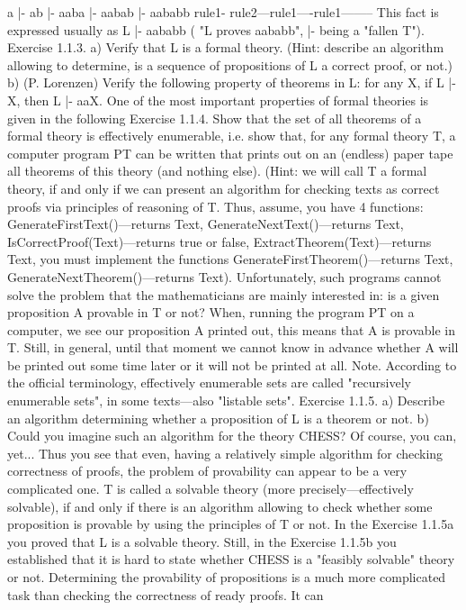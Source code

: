 a |- ab |- aaba |- aabab |- aababb
rule1- rule2---rule1----rule1--------
This fact is expressed usually as L |- aababb ( "L proves aababb", |- being a "fallen T").
Exercise 1.1.3. a) Verify that L is a formal theory. (Hint: describe an algorithm allowing to determine, is a
sequence of propositions of L a correct proof, or not.)
b) (P. Lorenzen) Verify the following property of theorems in L: for any X, if L |- X, then L |- aaX.
One of the most important properties of formal theories is given in the following
Exercise 1.1.4. Show that the set of all theorems of a formal theory is effectively enumerable, i.e.
show that, for any formal theory T, a computer program PT can be written that prints out on an (endless)
paper tape all theorems of this theory (and nothing else). (Hint: we will call T a formal theory, if and only
if we can present an algorithm for checking texts as correct proofs via principles of reasoning of T. Thus,
assume, you have 4 functions: GenerateFirstText()---returns Text, GenerateNextText()---returns Text,
IsCorrectProof(Text)---returns true or false, ExtractTheorem(Text)---returns Text, you must implement the
functions GenerateFirstTheorem()---returns Text, GenerateNextTheorem()---returns Text).
Unfortunately, such programs cannot solve the problem that the mathematicians are mainly
interested in: is a given proposition A provable in T or not? When, running the program PT on a
computer, we see our proposition A printed out, this means that A is provable in T. Still, in general, until
that moment we cannot know in advance whether A will be printed out some time later or it will not be
printed at all.
Note. According to the official terminology, effectively enumerable sets are called "recursively
enumerable sets", in some texts---also "listable sets".
Exercise 1.1.5. a) Describe an algorithm determining whether a proposition of L is a theorem or not.
b) Could you imagine such an algorithm for the theory CHESS? Of course, you can, yet... Thus you see
that even, having a relatively simple algorithm for checking correctness of proofs, the problem of
provability can appear to be a very complicated one.
T is called a solvable theory (more precisely---effectively solvable), if and only if there is an algorithm
allowing to check whether some proposition is provable by using the principles of T or not. In the
Exercise 1.1.5a you proved that L is a solvable theory. Still, in the Exercise 1.1.5b you established that it
is hard to state whether CHESS is a "feasibly solvable" theory or not. Determining the provability of
propositions is a much more complicated task than checking the correctness of ready proofs. It can
